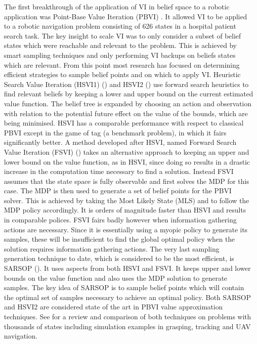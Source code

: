 The first breakthrough of the application of VI in belief space to a robotic application was Point-Base Value Iteration (PBVI) \cite{PBVI}. It allowed VI to be applied to a robotic 
navigation problem consisting of 626 states in a hospital patient search task. The key insight to scale VI was to only consider a subset of belief 
states which were reachable and relevant to the problem. This is achieved by smart sampling techniques and only performing VI backups on beliefs states which are relevant. 
From this point most research has focused on determining efficient strategies to sample belief points and on which to apply VI. Heuristic Search Value Iteration (HSVI1) (\cite{HSV}) 
and HSVI2 (\cite{HSVI2}) use forward search heuristics to find relevant beliefs by keeping a lower and upper bound on the current estimated value function. The belief tree 
is expanded by choosing an action and observation with relation to the potential future effect on the value of the bounds, which are being minimised. HSVI has a comparable performance with respect to classical PBVI except in the
game of tag (a benchmark problem), in which it fairs significantly better. 
A method developed after HSVI, named Forward Search Value Iteration (FSVI) (\cite{FSVI}) takes an alternative approach to keeping an upper and lower bound on the 
value function, as in HSVI, since doing so results in a drastic increase in the computation time necessary to find a solution. Instead FSVI assumes that the state 
space is fully observable and first solves the MDP for this case. The MDP is then used to generate a set of belief points for the PBVI solver. This is achieved by 
taking the Most Likely State (MLS) and to follow the MDP policy accordingly. It is orders of magnitude faster than HSVI and results in comparable polices. FSVI fairs badly however when information gathering actions are necessary. 
Since it is essentially using a myopic policy to generate its samples, these will be insufficient to find the global optimal policy when the solution requires information gathering actions. The very last sampling generation technique to date, which is considered to be the most efficient, is SARSOP (\cite{SARSOP}).
It uses aspects from both HSVI and FSVI. It keeps upper and lower bounds on the value function and also uses the MDP solution to generate samples. 
The key idea of SARSOP is to sample belief points which will contain the optimal set of samples necessary to achieve an optimal policy.  
Both SARSOP and HSVI2 are considered state of the art in PBVI value approximation techniques. See \cite{POMDP_approach_2010} for a review and comparison of both techniques on problems 
with thousands of states including simulation examples in grasping, tracking and UAV navigation. 

